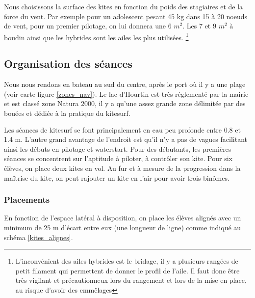\documentclass[11pt,a4paper]{report}
\begin{document}
Nous choisissons la surface des kites
en fonction du poids des stagiaires et de la force du vent.
Par exemple pour un adolescent pesant 45 kg dans 15 à 20 noeuds
de vent, pour un premier pilotage, on lui donnera une 6 $m^2$.
Les 7 et 9 $m^2$ à boudin ainsi que  les hybrides sont les ailes
les plus utilisées.
\footnote{L'inconvénient des ailes hybrides est le bridage,
il y a plusieurs rangées de petit filament qui permettent
de donner le profil de l'aile. Il faut donc \^etre très 
vigilant et précautionneux lors du rangement et lors de 
la mise en place, au risque d'avoir des emm\^elages}


\subsection{Organisation des séances}

Nous nous rendons en bateau au sud du centre, après le port o\`u
il y a une plage (voir carte figure \ref{zones_nav}). Le lac 
d'Hourtin est très réglementé par la mairie et est classé
zone Natura 2000\cite{natura2000}, 
il y a qu'une assez grande zone délimitée par des bouées et 
dédiée à la pratique du kitesurf.

Les séances de kitesurf se font principalement en eau peu profonde
entre 0.8 et 1.4 m. L'autre grand avantage de l'endroit est
qu'il n'y a pas de vagues facilitant ainsi les débuts en pilotage
et waterstart.
Pour des débutants, les premières séances se concentrent sur l'aptitude
à piloter, à contrôler son kite. Pour six élèves, on place deux kites en vol.
Au fur et à mesure de la progression dans la ma\^itrise du kite, 
on peut rajouter un kite en l'air pour avoir trois bin\^omes.



\subsubsection{Placements}

En fonction de l'espace latéral à disposition, on place les élèves
alignés avec un minimum de 25 m d'écart entre eux (une longueur de ligne) 
comme indiqué au schéma \ref{kites_alignes}.
\end{document}

